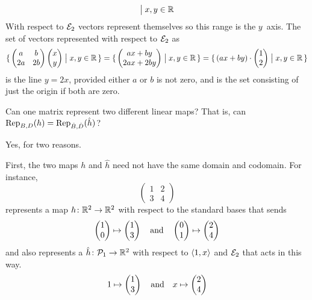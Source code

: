 \begin{exercises}
\begin{answer}
\begin{exparts}
\begin{equation*}
{                  \suchthat x,y\in\Re}
          \end{equation*}
          With respect to $\stdbasis_2$ vectors represent 
          themselves so this range
          is the $y$~axis.
        \partsitem The set of vectors represented with 
          respect to $\stdbasis_2$ as
          \begin{equation*}
            \set{
              \begin{pmatrix}
                a   &b  \\
                2a  &2b
              \end{pmatrix}
              \colvec{x  \\ y}
              \suchthat x,y\in\Re}
            =\set{\colvec{ax+by  \\ 2ax+2by}
                  \suchthat x,y\in\Re}
            =\set{(ax+by)\cdot\colvec{1  \\ 2}
                  \suchthat x,y\in\Re}
          \end{equation*}
          is the line $y=2x$, provided either $a$ or $b$ is not zero, and
          is the set consisting of just the origin if both are zero.
      \end{exparts}  
    \end{answer}
  \recommended \item  
    Can one matrix represent two different linear maps?
    That is, can \( \rep{h}{B,D}=\rep{\hat{h}}{\hat{B},\hat{D}} \)?
    \begin{answer}
      Yes, for two reasons.

      First, the two maps $h$ and $\hat{h}$ need not have the same domain
      and codomain.
      For instance,
      \begin{equation*}
        \begin{pmatrix}
          1  &2  \\
          3  &4
        \end{pmatrix}
      \end{equation*}
      represents a map \( \map{h}{\Re^2}{\Re^2} \) with respect to the standard
      bases that sends
      \begin{equation*}
        \colvec{1 \\ 0}\mapsto\colvec{1 \\ 3}
        \quad\text{and}\quad
        \colvec{0 \\ 1}\mapsto\colvec{2 \\ 4}
      \end{equation*}
      and also represents a
      \( \map{\hat{h}}{\polyspace_1}{\Re^2} \) with respect to
      \( \sequence{1,x} \) and \( \stdbasis_2 \) that acts in this way.
      \begin{equation*}
        1\mapsto\colvec{1 \\ 3}
        \quad\text{and}\quad
        x\mapsto\colvec{2 \\ 4}
      \end{equation*}


\end{answer}
\end{exercises}
